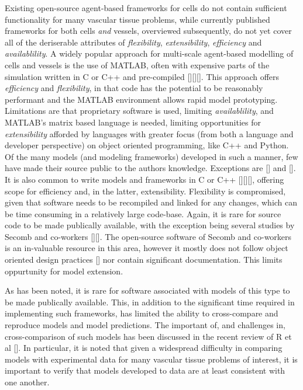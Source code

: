 \documentclass[superscriptaddress, a4paper]{article}
\begin{document}
Existing open-source agent-based frameworks for cells do not contain sufficient functionality for many vascular tissue problems, while currently published frameworks for both cells \emph{and} vessels, overviewed subsequently, do not yet cover all of the deriserable attributes of \emph{flexibility}, \emph{extensibility},  \emph{efficiency} and \emph{availablility}. A widely popular approach for multi-scale agent-based modelling of cells and vessels is the use of MATLAB, often with expensive parts of the simulation written in C or C++ and pre-compiled [][][]. This approach offers \emph{efficiency} and \emph{flexibility}, in that code has the potential to be reasonably performant and the MATLAB environment allows rapid model prototyping. Limitations are that proprietary software is used, limiting \emph{availablility}, and MATLAB's matrix based language is needed, limiting opportunities for \emph{extensibility} afforded by languages with greater focus (from both a language and developer perspective) on object oriented programming, like C++ and Python. Of the many models (and modeling frameworks) developed in such a manner, few have made their source public to the authors knowledge. Exceptions are [] and []. It is also common to write models and frameworks in C or C++ [][][], offering scope for efficiency and, in the latter, extensibility. Flexibility is compromised, given that software needs to be recompiled and linked for any changes, which can be time consuming in a relatively large code-base. Again, it is rare for source code to be made publically available, with the exception being several studies by Secomb and co-workers [][]. The open-source software of Secomb and co-workers is an in-valuable resource in this area, however it mostly does not follow object oriented design practices [] nor contain significant documentation. This limits oppurtunity for model extension. 

As has been noted, it is rare for software associated with models of this type to be made publically available. This, in addition to the significant time required in implementing such frameworks, has limited the ability to cross-compare and reproduce models and model predictions. The important of, and challenges in, cross-comparison of such models has been discussed in the recent review of R et al []. In particular, it is noted that given a widespread difficulty in comparing models with experimental data for many vascular tissue problems of interest, it is important to verify that models developed to data are at least consistent with one another.
\end{document}
